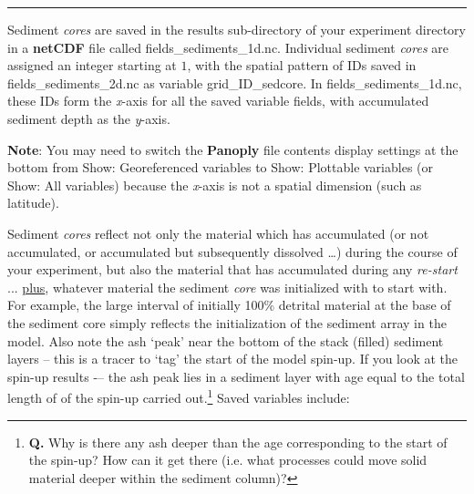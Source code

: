 \vspace{1mm}\noindent\rule{4cm}{0.1mm}\vspace{2mm}

\noindent Sediment \textit{cores} are saved in the \textsf{\footnotesize results} sub-directory of your experiment directory in a \textbf{netCDF} file called \textsf{\footnotesize fields\_sediments\_1d.nc}. Individual sediment \textit{cores} are assigned an integer starting at $1$, with the spatial pattern of IDs saved in \textsf{\footnotesize fields\_sediments\_2d.nc} as variable \textsf{\footnotesize grid\_ID\_sedcore}. In \textsf{\footnotesize fields\_sediments\_1d.nc}, these IDs form the \textit{x}-axis for all the saved variable fields, with accumulated sediment depth as the \textit{y}-axis.

\textbf{Note}: You may need to switch the \textbf{Panoply} file contents display settings at the bottom from \textsf{\footnotesize Show: Georeferenced variables} to \textsf{\footnotesize Show: Plottable variables} (or \textsf{\footnotesize Show: All variables}) because the \textit{x}-axis is not a spatial dimension (such as latitude).

\newpage

Sediment \textit{cores} reflect not only the material which has accumulated (or not accumulated, or accumulated but  subsequently dissolved …) during the course of your experiment, but also the material that has accumulated during any \textit{re-start} ... \uline{plus}, whatever material the sediment \textit{core} was initialized with to start with. For example, the large interval of initially 100\% detrital material at the base of the sediment core simply reflects the initialization of the sediment array in the model. Also note the ash ‘peak’ near the bottom of the stack (filled) sediment layers – this is a tracer to ‘tag’ the start of the model spin-up. If you look at the spin-up results -– the ash peak lies in a sediment layer with age equal to the total length of of the spin-up carried out.\footnote{\textbf{Q.} Why is there any ash deeper than the age corresponding to the start of the spin-up? How can it get there (i.e. what processes could move solid material deeper within the sediment column)?} Saved variables include:

